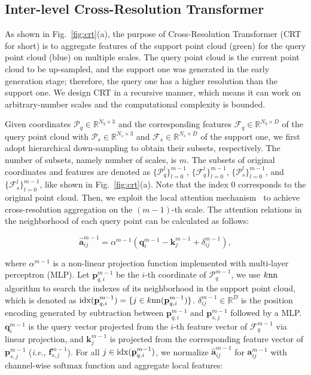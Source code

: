 \documentclass[letterpaper]{article} %
\newcommand{\ve}[1]{\mathbf{#1}} %
\newcommand{\ma}[1]{\mathrm{#1}} %
\begin{document}
\subsection{Inter-level Cross-Resolution Transformer}
As shown in Fig.~\ref{fig:crt}(a), the purpose of Cross-Resolution Transformer (CRT for short) is to aggregate features of the support point cloud (green) for the query point cloud (blue) on multiple scales. 
The query point cloud is the current point cloud to be up-sampled, and the support one was generated in the early generation stage; therefore, the query one has a higher resolution than the support one. 
We design CRT in a  recursive manner, which means it can work on arbitrary-number scales and the computational complexity is bounded.

Given coordinates $\mathcal{P}_q \in {\mathbb R}^{N_q \times 3}$ and the corresponding features $\mathcal{F}_q  \in {\mathbb R}^{N_q \times D}$ of the query point cloud with $\mathcal{P}_s \in {\mathbb R}^{N_s \times 3}$ and  $\mathcal{F}_s  \in {\mathbb R}^{N_s \times D}$ of the support one, 
we first adopt hierarchical down-sampling to obtain their subsets, respectively. 
The number of subsets, namely number of scales, is $m$. 
The subsets of original  coordinates and features are denoted as $\{\mathcal{P}_q^l\}_{l=0}^{m-1}$, $\{\mathcal{F}_q^l\}_{l=0}^{m-1}$, $\{\mathcal{P}_s^l\}_{l=0}^{m-1}$, and $\{\mathcal{F}_s^l\}_{l=0}^{m-1}$, like shown in Fig.~\ref{fig:crt}(a). 
Note that the index $0$ corresponds to the original point cloud. 
Then, we exploit the local attention mechanism~\cite{zhao2021point} to achieve cross-resolution aggregation on the $(m-1)$-th scale. 
The attention relations in the neighborhood of each query point can be calculated as follows:

\begin{equation}
{\hat{\ve{a}} ^{m-1}_{ij}} = {\alpha^{m-1}} (\ve{q}^{m-1}_i - \ve{k}^{m-1}_j+\delta^{m-1}_{ij}),
\end{equation}

{\noindent}where ${\alpha^{m-1}}$  is a non-linear projection function implemented with multi-layer perceptron (MLP).
Let $\ve{p}^{m-1}_{q, i}$ be the $i$-th coordinate of $\mathcal{P}_q^{m-1}$, we use $k\rm nn$ algorithm to search the indexes of its neighborhood in the support point cloud, which is denoted as ${\rm idx}(\ve{p}^{m-1}_{q, i}) = \{j \in k{\rm nn}(\ve{p}^{m-1}_{q, i})\}$.
$\delta^{m-1}_{ij} \in \mathbb{R}^{D}$ is the position encoding generated by subtraction between $\ve{p}^{m-1}_{q,i}$  and $\ve{p}^{m-1}_{s, j}$ followed by a MLP.
$\ve{q}^{m-1}_i$ is the query vector projected from the $i$-th feature vector of $\mathcal{F}_q^{m-1}$ via linear projection, and $\ve{k}^{m-1}_j$ is projected from the corresponding feature vector of $\ve{p}^{m-1}_{s, j}$ ({\em i.e.}, $\ve{f}^{m-1}_{s, j}$). 
For all $j \in {\rm idx}(\ve{p}^{m-1}_{q, i})$, we normalize ${\hat{\ve{a}} ^{m-1}_{ij}}$ for ${\ve{a}} ^{m-1}_{ij}$ with channel-wise $\ma{softmax}$ function and  aggregate local features:
\end{document}
